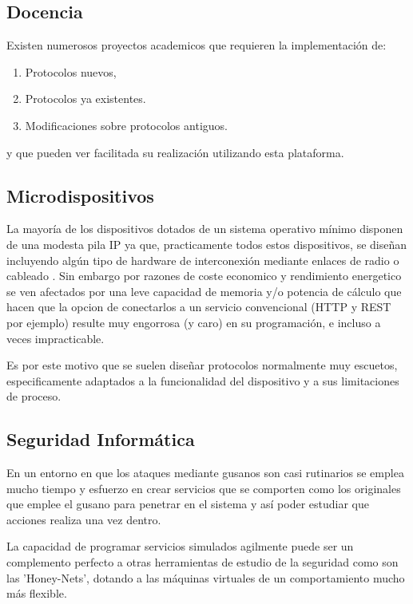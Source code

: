 \documentclass[a4paper,spanish,12pt]{book}
\begin{document}
\subsection{Docencia}
Existen numerosos proyectos academicos que requieren la implementaci\'on de:
\begin{enumerate}
	\item Protocolos nuevos,
	\item Protocolos ya existentes.
	\item Modificaciones sobre protocolos antiguos. 
\end{enumerate}

y que pueden ver facilitada su realización utilizando esta plataforma.

\subsection{Microdispositivos}
La mayor\'ia de los dispositivos dotados de un sistema operativo m\'inimo disponen de una modesta pila IP ya que, practicamente todos estos dispositivos, se dise\~{n}an incluyendo algún tipo de hardware de interconexi\'on mediante enlaces de radio o cableado . Sin embargo por razones de coste economico y rendimiento energetico se ven afectados por una leve capacidad de memoria y/o potencia de c\'alculo que hacen que la opcion de conectarlos a un servicio convencional (HTTP y REST por ejemplo) resulte muy engorrosa (y caro) en su programaci\'on, e incluso a veces impracticable.

Es por este motivo que se suelen dise\~{n}ar protocolos normalmente muy escuetos, especificamente adaptados a la funcionalidad del dispositivo y a sus limitaciones de proceso.

\subsection{Seguridad Inform\'atica}
En un entorno en que los ataques mediante gusanos son casi rutinarios se emplea mucho tiempo y esfuerzo en crear servicios que se comporten como los originales que emplee el gusano para penetrar en el sistema y as\'i poder estudiar que acciones realiza una vez dentro.

La capacidad de programar servicios simulados agilmente puede ser un complemento perfecto a otras herramientas de estudio de la seguridad como son las 'Honey-Nets', dotando a las m\'aquinas virtuales de un comportamiento mucho m\'as flexible.
\end{document}
